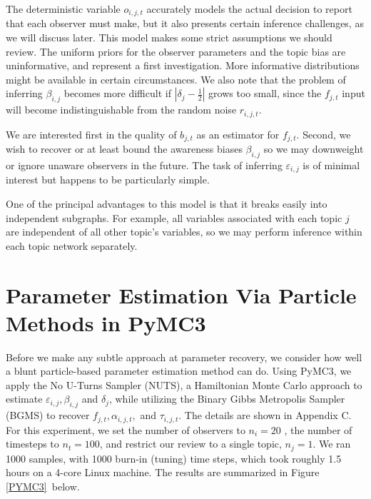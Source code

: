 \documentclass{amsart}
\theoremstyle{plain}
\numberwithin{equation}{section}
\begin{document}

The deterministic variable $o_{i,j,t}$ accurately models the actual decision
to report that each observer must make, but it also presents certain
inference challenges, as we will discuss later. This model makes some strict
assumptions we should review. The uniform priors for the observer parameters
and the topic bias are uninformative, and represent a first investigation.
More informative distributions might be available in certain circumstances.
We also note that the problem of inferring $\beta _{i,j}$ becomes more
difficult if $\left\vert \delta _{j}-\frac{1}{2}\right\vert $ grows too
small, since the $f_{j,t}$ input will become indistinguishable from the
random noise $r_{i,j,t}$.

We are interested first in the quality of $b_{j,t}$ as an estimator for $%
f_{j,t}$. Second, we wish to recover or at least bound the awareness biases $%
\beta _{i,j}$ so we may downweight or ignore unaware observers in the
future. The task of inferring $\varepsilon _{i,j}$ is of minimal interest
but happens to be particularly simple.

One of the principal advantages to this model is that it breaks easily into
independent subgraphs. For example, all variables associated with each topic 
$j$ are independent of all other topic's variables, so we may perform
inference within each topic network separately.

\section{Parameter Estimation Via Particle Methods in PyMC3}

Before we make any subtle approach at parameter recovery, we consider how
well a blunt particle-based parameter estimation method can do. Using PyMC3,
we apply the No U-Turns Sampler (NUTS), a Hamiltonian Monte Carlo approach
to estimate $\varepsilon _{i,j},\beta _{i,j}$ and $\delta _{j}$, while
utilizing the Binary Gibbs Metropolis Sampler (BGMS) to recover $%
f_{j,t},\alpha _{i,j,t},$ and $\tau _{i,j,t}$. The details are shown in
Appendix C. For this experiment, we set the number of observers to $n_{i}=20$%
, the number of timesteps to $n_{t}=100$, and restrict our review to a
single topic, $n_{j}=1$. We ran 1000 samples, with 1000 burn-in (tuning)
time steps, which took roughly 1.5 hours on a 4-core Linux machine. The
results are summarized in Figure \ref{PYMC3}\ below.
\end{document}
